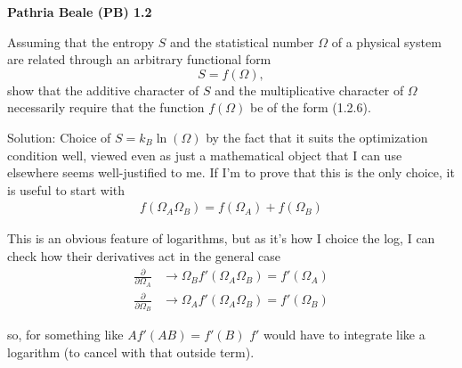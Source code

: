 \begin{homeworkProblem}
    \textbf{Pathria Beale (PB) 1.2}

    Assuming that the entropy $S$ and the statistical number $\Omega$ of a physical system are related through an arbitrary functional form
    $$
    S=f(\Omega),
    $$
    show that the additive character of $S$ and the multiplicative character of $\Omega$ necessarily require that the function $f(\Omega)$ be of the form (1.2.6).

    \begin{callout}{Solution:}
    Choice of $S = k_B\ln(\Omega)$ by the fact that it suits the optimization condition well, viewed even as just a mathematical object that I can use elsewhere seems well-justified to me. If I'm to prove that this is the only choice, it is useful to start with
    \begin{align*}
        f(\Omega_A \Omega_B) = f(\Omega_A) + f(\Omega_B)
    \end{align*}

    This is an obvious feature of logarithms, but as it's how I choice the log, I can check how their derivatives act in the general case
    \begin{align*}
        \frac{\partial}{\partial \Omega_A} &\to \Omega_B f'(\Omega_A \Omega_B) = f'(\Omega_A) \\
        \frac{\partial}{\partial \Omega_B} &\to \Omega_A f'(\Omega_A \Omega_B) = f'(\Omega_B)
    \end{align*}

    so, for something like $Af'(AB)=f'(B)$ $f'$ would have to integrate like a logarithm (to cancel with that outside term).


\end{callout}
\end{homeworkProblem}
